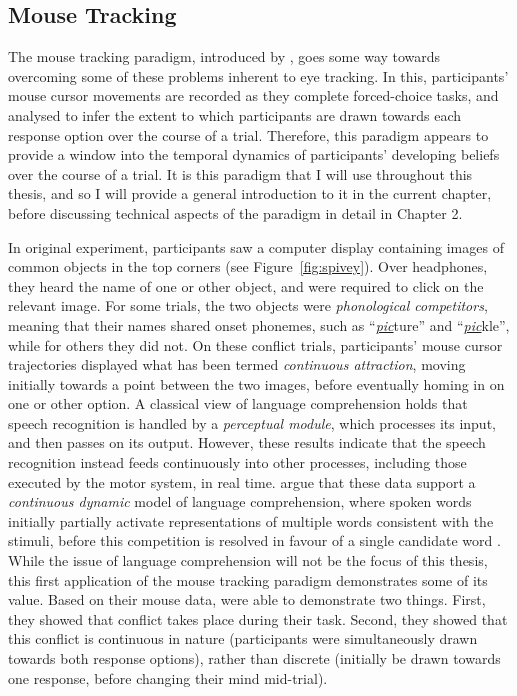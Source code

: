 \subsection{Mouse Tracking}
\label{subsec:chapter1-measurement-mousetracking}

The mouse tracking paradigm,
introduced by \citet{Spivey2005},
goes some way towards overcoming
some of these problems inherent to eye tracking.
In this, participants' mouse cursor movements are recorded
as they complete forced-choice tasks,
and analysed to infer the extent to which
participants are drawn towards each response option
over the course of a trial.
Therefore, this paradigm appears to provide
a window into the temporal dynamics of
participants' developing beliefs over the course of a trial.
It is this paradigm that I will use throughout this thesis,
and so I will provide a general introduction to it
in the current chapter,
before discussing technical aspects of the paradigm in detail in Chapter 2.

In  original experiment,
participants saw a computer display
containing images of  common objects in the top corners (see Figure~\ref{fig:spivey}).
Over headphones, they heard the name of one or other object,
and were required to click on the relevant image.
For some trials, the two objects were \emph{phonological competitors},
meaning that their names shared onset phonemes, such as ``\underline{\emph{pic}}ture'' and ``\underline{\emph{pic}}kle'',
while for others they did not.
On these conflict trials, participants' mouse cursor trajectories
displayed what has been termed \emph{continuous attraction},
moving initially towards a point between the two images,
before eventually homing in on one or other option.
A classical view of language comprehension \citep{Fodor1983}
holds that speech recognition is handled by a \emph{perceptual module},
which processes its input, and then passes on its output.
However, these results indicate that
the speech recognition instead feeds continuously into other processes,
including those executed by the motor system, in real time.
\citet{Spivey2005} argue that these data
support a \emph{continuous dynamic} model of language comprehension,
where spoken words initially partially activate
representations of multiple words consistent with the stimuli,
before this competition is resolved in favour of a single candidate word \citep[see also][]{Spivey2007}.
While the issue of language comprehension will not be the focus of this thesis,
this first application of the mouse tracking paradigm demonstrates some of its value.
Based on their mouse data, \citet{Spivey2005} were able
to demonstrate two things.
First, they showed that conflict takes place during their task.
Second, they showed that this conflict is continuous in nature
(participants were simultaneously drawn towards both response options),
rather than discrete 
(initially be drawn towards one response,
before changing their mind mid-trial).

